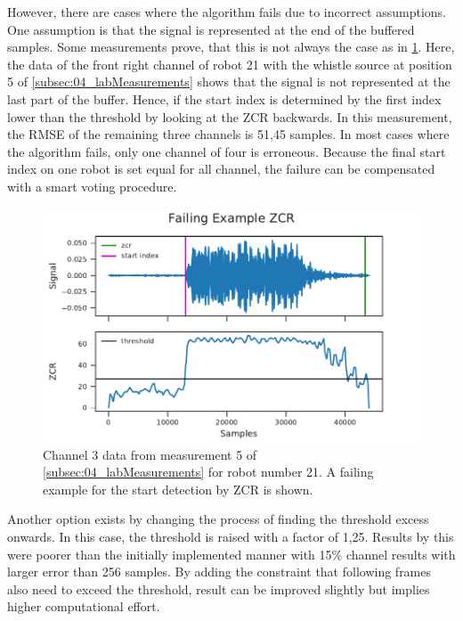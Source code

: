 However, there are cases where the algorithm fails due to incorrect assumptions.
One assumption is that the signal is represented at the end of the buffered
samples.
Some measurements prove, that this is not always the case as in \cref{fig:04_zcrFail}.
Here, the data of the front right channel of robot 21 with the whistle source
at position 5 of \cref{subsec:04_labMeasurements}
shows that the signal is not represented at the last part of the buffer.
Hence, if the start index is determined by the first index lower than
the threshold by looking at the \ac{ZCR} backwards.
In this measurement, the \ac{RMSE} of the remaining three channels is
51,45 samples.
In most cases where the algorithm fails, only one channel of four
is erroneous.
Because the final start index on one robot is set equal for all channel,
the failure can be compensated with a smart voting procedure.
\begin{figure}[ht]
	\centering
	\includegraphics[]{figures/evaluation/zcr_fail}
	\caption{Channel 3 data from measurement 5 of \cref{subsec:04_labMeasurements}
		for robot number 21. A failing example for the start detection by \ac{ZCR}
		is shown.}
	\label{fig:04_zcrFail}
\end{figure}

Another option exists by changing the process of finding the
threshold excess onwards.
In this case, the threshold is raised with a factor of 1,25.
Results by this were poorer than the initially implemented manner
with 15\si{\percent} channel results with larger error than 256 samples.
By adding the constraint that following frames also need to exceed the
threshold, result can be improved slightly but implies higher
computational effort.

